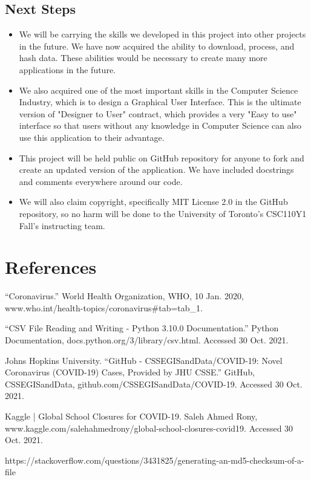\documentclass[fontsize=11pt]{article}
\begin{document}
    \subsection{Next Steps}

    \begin{itemize}
        \item We will be carrying the skills we developed in this project into other projects in the future. We have now acquired the ability to download, process, and hash data. These abilities would be necessary to create many more applications in the future.
        \item We also acquired one of the most important skills in the Computer Science Industry, which is to design a Graphical User Interface. This is the ultimate version of "Designer to User" contract, which provides a very "Easy to use" interface so that users without any knowledge in Computer Science can also use this application to their advantage.
        \item This project will be held public on GitHub repository for anyone to fork and create an updated version of the application. We have included docstrings and comments everywhere around our code.
        \item We will also claim copyright, specifically MIT License 2.0 in the GitHub repository, so no harm will be done to the University of Toronto's CSC110Y1 Fall's instructing team.
    \end{itemize}

    \newpage

    \section{References}

    ``Coronavirus.'' World Health Organization, WHO, 10 Jan. 2020, www.who.int/health-topics/coronavirus\#tab=tab\_1.

    ``CSV File Reading and Writing - Python 3.10.0 Documentation.'' Python Documentation, docs.python.org/3/library/csv.html. Accessed 30 Oct. 2021.

    Johns Hopkins University. ``GitHub - CSSEGISandData/COVID-19: Novel Coronavirus (COVID-19) Cases, Provided by JHU CSSE.'' GitHub, CSSEGISandData, github.com/CSSEGISandData/COVID-19. Accessed 30 Oct. 2021.

    Kaggle | Global School Closures for COVID-19. Saleh Ahmed Rony, www.kaggle.com/salehahmedrony/global-school-closures-covid19. Accessed 30 Oct. 2021.

    https://stackoverflow.com/questions/3431825/generating-an-md5-checksum-of-a-file
\end{document}
